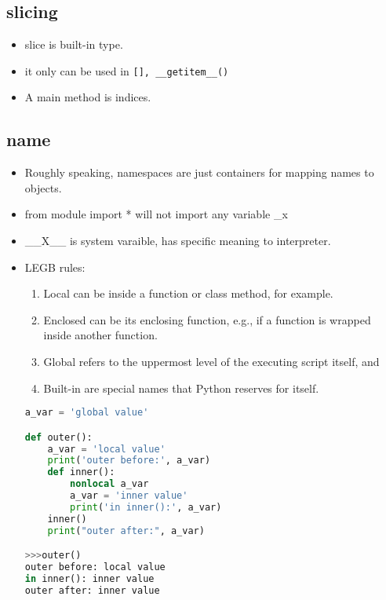 \documentclass[a4paper,12pt,twoside]{book}
\begin{document}
\subsection{slicing}
\begin{itemize}
	\item slice is built-in type.
	\item it only can be used in \verb|[], __getitem__()|
	\item A main method is indices. 
\end{itemize}


\subsection{name}
\begin{itemize}
	\item Roughly speaking, namespaces are just containers for mapping names to objects. 
	
	\item from module import * will not import  any variable \_x

	\item \_\_X\_\_ is system varaible, has specific meaning to interpreter. 

	\item LEGB rules:
	\begin{enumerate}
		\item 	Local can be inside a function or class method, for example.
		
		\item Enclosed can be its enclosing function, e.g., if a function is wrapped inside another function.
		
		\item Global refers to the uppermost level of the executing script itself, and
		
		\item Built-in are special names that Python reserves for itself.
	\end{enumerate}

\begin{lstlisting}[frame=single, language=Python]
a_var = 'global value'

def outer():
	a_var = 'local value'
	print('outer before:', a_var)
	def inner():
		nonlocal a_var
		a_var = 'inner value'
		print('in inner():', a_var)
	inner()
	print("outer after:", a_var)

>>>outer()
outer before: local value
in inner(): inner value
outer after: inner value
	\end{lstlisting}  
	

\end{itemize}
\end{document}
